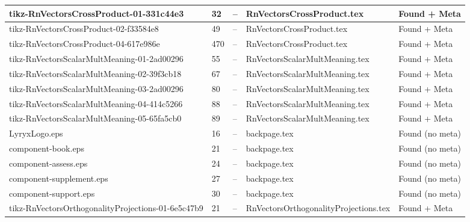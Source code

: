 \documentclass[11pt]{article}
\begin{document}
\begin{longtable}{|p{3.5cm}|p{1.5cm}|p{1cm}|p{4cm}|p{2cm}|}
tikz-RnVectorsCrossProduct-01-331c44e3 & 32 & -- & RnVectorsCrossProduct.tex & \textcolor{found}{Found + Meta} \\
\hline

tikz-RnVectorsCrossProduct-02-f33584e8 & 49 & -- & RnVectorsCrossProduct.tex & \textcolor{found}{Found + Meta} \\
\hline

tikz-RnVectorsCrossProduct-04-617e986e & 470 & -- & RnVectorsCrossProduct.tex & \textcolor{found}{Found + Meta} \\
\hline

tikz-RnVectorsScalarMultMeaning-01-2ad00296 & 55 & -- & RnVectorsScalarMultMeaning.tex & \textcolor{found}{Found + Meta} \\
\hline

tikz-RnVectorsScalarMultMeaning-02-39f3cb18 & 67 & -- & RnVectorsScalarMultMeaning.tex & \textcolor{found}{Found + Meta} \\
\hline

tikz-RnVectorsScalarMultMeaning-03-2ad00296 & 80 & -- & RnVectorsScalarMultMeaning.tex & \textcolor{found}{Found + Meta} \\
\hline

tikz-RnVectorsScalarMultMeaning-04-414c5266 & 88 & -- & RnVectorsScalarMultMeaning.tex & \textcolor{found}{Found + Meta} \\
\hline

tikz-RnVectorsScalarMultMeaning-05-65fa5cb0 & 89 & -- & RnVectorsScalarMultMeaning.tex & \textcolor{found}{Found + Meta} \\
\hline

LyryxLogo.eps & 16 & -- & backpage.tex & \textcolor{warning}{Found (no meta)} \\
\hline

component-book.eps & 21 & -- & backpage.tex & \textcolor{warning}{Found (no meta)} \\
\hline

component-assess.eps & 24 & -- & backpage.tex & \textcolor{warning}{Found (no meta)} \\
\hline

component-supplement.eps & 27 & -- & backpage.tex & \textcolor{warning}{Found (no meta)} \\
\hline

component-support.eps & 30 & -- & backpage.tex & \textcolor{warning}{Found (no meta)} \\
\hline

tikz-RnVectorsOrthogonalityProjections-01-6e5c47b9 & 21 & -- & RnVectorsOrthogonalityProjections.tex & \textcolor{found}{Found + Meta} \\
\hline


\end{longtable}
\end{document}
